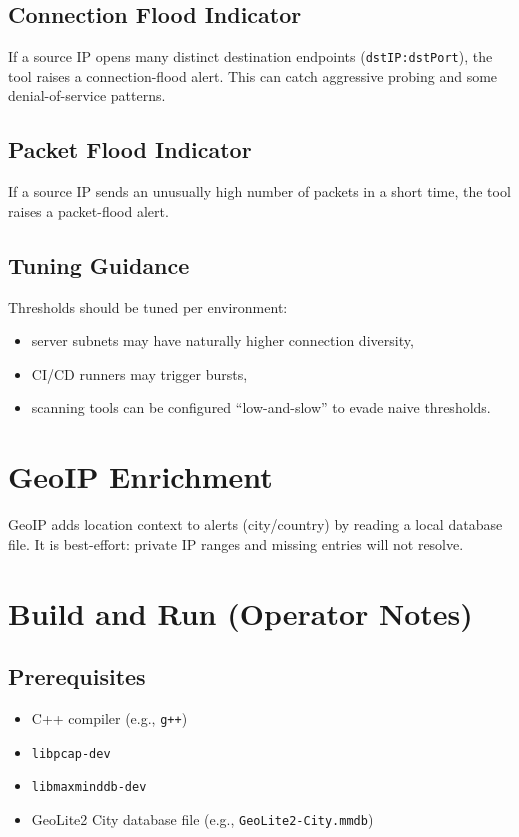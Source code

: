 \documentclass[14pt]{extarticle}
\begin{document}
\subsection{Connection Flood Indicator}
If a source IP opens many distinct destination endpoints (\texttt{dstIP:dstPort}), the tool raises a connection-flood alert. This can catch aggressive probing and some denial-of-service patterns.

\subsection{Packet Flood Indicator}
If a source IP sends an unusually high number of packets in a short time, the tool raises a packet-flood alert.

\subsection{Tuning Guidance}
Thresholds should be tuned per environment:
\begin{itemize}
  \item server subnets may have naturally higher connection diversity,
  \item CI/CD runners may trigger bursts,
  \item scanning tools can be configured ``low-and-slow'' to evade naive thresholds.
\end{itemize}

\section{GeoIP Enrichment}
GeoIP adds location context to alerts (city/country) by reading a local database file. It is best-effort: private IP ranges and missing entries will not resolve.

\section{Build and Run (Operator Notes)}
\subsection{Prerequisites}
\begin{itemize}
  \item C++ compiler (e.g., \texttt{g++})
  \item \texttt{libpcap-dev}\cite{libpcap}
  \item \texttt{libmaxminddb-dev}\cite{maxminddb}
  \item GeoLite2 City database file (e.g., \texttt{GeoLite2-City.mmdb})\cite{geolite2}
\end{itemize}
\end{document}
